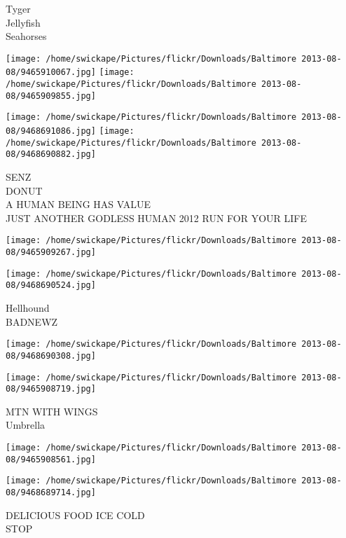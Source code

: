 \documentclass[10pt,letterpaper]{article}
\begin{document}
Tyger\\
Jellyfish\\
Seahorses\\
\pagebreak

\texttt{[image: /home/swickape/Pictures/flickr/Downloads/Baltimore 2013-08-08/9465910067.jpg]}
\texttt{[image: /home/swickape/Pictures/flickr/Downloads/Baltimore 2013-08-08/9465909855.jpg]}

\texttt{[image: /home/swickape/Pictures/flickr/Downloads/Baltimore 2013-08-08/9468691086.jpg]}
\texttt{[image: /home/swickape/Pictures/flickr/Downloads/Baltimore 2013-08-08/9468690882.jpg]}

SENZ\\
DONUT\\
A HUMAN BEING HAS VALUE\\
JUST ANOTHER GODLESS HUMAN 2012 RUN FOR YOUR LIFE\\
\pagebreak

\texttt{[image: /home/swickape/Pictures/flickr/Downloads/Baltimore 2013-08-08/9465909267.jpg]}

\vspace{0.25in}
\texttt{[image: /home/swickape/Pictures/flickr/Downloads/Baltimore 2013-08-08/9468690524.jpg]}

Hellhound\\
BADNEWZ\\
\pagebreak

\texttt{[image: /home/swickape/Pictures/flickr/Downloads/Baltimore 2013-08-08/9468690308.jpg]}

\vspace{0.25in}
\texttt{[image: /home/swickape/Pictures/flickr/Downloads/Baltimore 2013-08-08/9465908719.jpg]}

MTN WITH WINGS\\
Umbrella\\
\pagebreak

\texttt{[image: /home/swickape/Pictures/flickr/Downloads/Baltimore 2013-08-08/9465908561.jpg]}

\vspace{0.25in}
\texttt{[image: /home/swickape/Pictures/flickr/Downloads/Baltimore 2013-08-08/9468689714.jpg]}

DELICIOUS FOOD ICE COLD\\
STOP\\
\pagebreak
\end{document}
